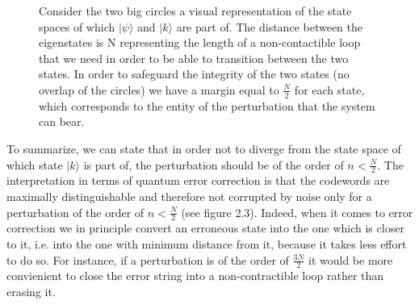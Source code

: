 \documentclass{Configuration_Files/PoliMi3i_thesis}
\begin{document}
\begin{figure}
	\begin{center}
		
		
	\end{center}
	\caption{Consider the two big circles a visual representation of the state spaces of which $|\psi\rangle$ and $|k\rangle$ are part of. The distance between the eigenstates is N representing the length of a non-contactible loop that we need in order to be able to transition between the two states. In order to safeguard the integrity of the two states (no overlap of the circles) we have a margin equal to $\frac{N}{2}$ for each state, which corresponds to the entity of the perturbation that the system can bear. }
	\label{fig:QEC}
\end{figure}


To summarize, we can state that in order not to diverge from the state space of which state $| k \rangle$  is part of, the perturbation should be of the order of $n < \frac{N}{2}$. 
The interpretation in terms of quantum error correction is that the codewords are maximally distinguishable and therefore not corrupted by noise only for a perturbation of the order of $n < \frac{N}{2}$ (see figure 2.3). 
Indeed, when it comes to error correction we in principle convert an erroneous state into the one which is closer to it, i.e. into the one with minimum distance from it, because it takes less effort to do so. For instance, if a perturbation is of the order of $\frac{3N}{2}$ it would be more convienient to close the error string into a non-contractible loop rather than erasing it. \newline

\end{document}
